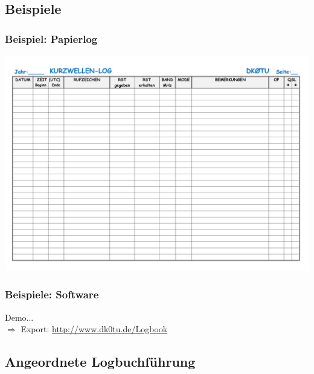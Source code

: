 \subsection{Beispiele}

\begin{frame}
    \frametitle{Beispiel: Papierlog}

    \begin{center}
        \includegraphics[width=1\textwidth]{bv13/dk0tu_log_kw.png}
    \end{center}

\end{frame}

\begin{frame}
    \frametitle{Beispiele: Software}
    
    \begin{center}

    \Large Demo... \\[3em]

    \normalsize $\Rightarrow$ Export: \url{http://www.dk0tu.de/Logbook}

    \end{center}

\end{frame}

\subsection{Angeordnete Logbuchführung}

